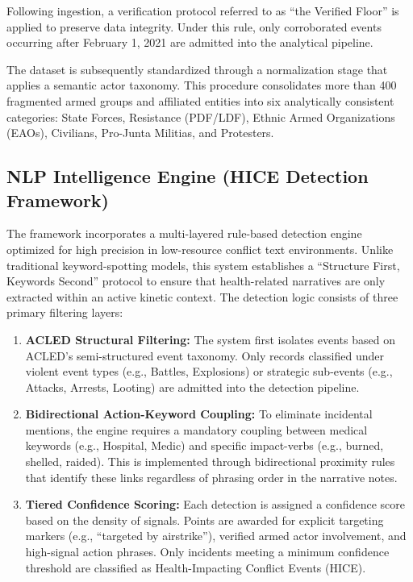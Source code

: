 \documentclass[conference]{IEEEtran}
\begin{document}
Following ingestion, a verification protocol referred to as ``the Verified Floor'' is applied to preserve data integrity. Under this rule, only corroborated events occurring after February 1, 2021 are admitted into the analytical pipeline.

The dataset is subsequently standardized through a normalization stage that applies a semantic actor taxonomy. This procedure consolidates more than 400 fragmented armed groups and affiliated entities into six analytically consistent categories: State Forces, Resistance (PDF/LDF), Ethnic Armed Organizations (EAOs), Civilians, Pro-Junta Militias, and Protesters.

\subsection{NLP Intelligence Engine (HICE Detection Framework)}

The framework incorporates a multi-layered rule-based detection engine optimized for high precision in low-resource conflict text environments. Unlike traditional keyword-spotting models, this system establishes a ``Structure First, Keywords Second'' protocol to ensure that health-related narratives are only extracted within an active kinetic context. The detection logic consists of three primary filtering layers:

\begin{enumerate}
    \item \textbf{ACLED Structural Filtering:} The system first isolates events based on ACLED's semi-structured event taxonomy. Only records classified under violent event types (e.g., Battles, Explosions) or strategic sub-events (e.g., Attacks, Arrests, Looting) are admitted into the detection pipeline.
    \item \textbf{Bidirectional Action-Keyword Coupling:} To eliminate incidental mentions, the engine requires a mandatory coupling between medical keywords (e.g., Hospital, Medic) and specific impact-verbs (e.g., burned, shelled, raided). This is implemented through bidirectional proximity rules that identify these links regardless of phrasing order in the narrative notes.
    \item \textbf{Tiered Confidence Scoring:} Each detection is assigned a confidence score based on the density of signals. Points are awarded for explicit targeting markers (e.g., ``targeted by airstrike''), verified armed actor involvement, and high-signal action phrases. Only incidents meeting a minimum confidence threshold are classified as Health-Impacting Conflict Events (HICE).
\end{enumerate}
\end{document}
